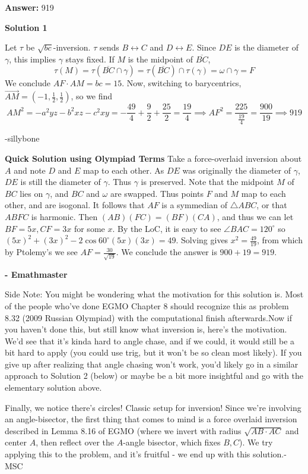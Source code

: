 \begin{enumerate}
 
 \textbf{Answer: }919



\textbf{Solution 1}

Let $\tau$ be $\sqrt{bc}$-inversion. $\tau$ sends $B \leftrightarrow C$ and $D\leftrightarrow E$. Since $DE$ is the diameter of $\gamma$, this implies $\gamma$ stays fixed. If $M$ is the midpoint of $\overline{BC}$, 
 \[\tau(M) = \tau(\overline{BC} \cap \gamma) = \tau(\overline{BC})\cap \tau(\gamma) = \omega \cap \gamma = F\] We conclude $AF\cdot AM = bc = 15$. Now, switching to barycentrics, $\overrightarrow{AM} = (-1, \frac{1}{2}, \frac{1}{2})$, so we find 
 \[AM^2 = -a^2yz-b^2xz-c^2xy = -\frac{49}{4} +\frac{9}{2}+\frac{25}{2} = \frac{19}{4} \implies AF^2 = \frac{225}{\frac{19}{4}}=\frac{900}{19} \implies \boxed{919}\]

 -sillybone

 \textbf{Quick Solution using Olympiad Terms} Take a force-overlaid inversion about $A$ and note $D$ and $E$ map to each other. As $DE$ was originally the diameter of $\gamma$, $DE$ is still the diameter of $\gamma$. Thus $\gamma$ is preserved. Note that the midpoint $M$ of $BC$ lies on $\gamma$, and $BC$ and $\omega$ are swapped. Thus points $F$ and $M$ map to each other, and are isogonal. It follows that $AF$ is a symmedian of $\triangle{ABC}$, or that $ABFC$ is harmonic. Then $(AB)(FC)=(BF)(CA)$, and thus we can let $BF=5x, CF=3x$ for some $x$. By the LoC, it is easy to see $\angle{BAC}=120^\circ$ so $(5x)^2+(3x)^2-2\cos{60^\circ}(5x)(3x)=49$. Solving gives $x^2=\frac{49}{19}$, from which by Ptolemy's we see $AF=\frac{30}{\sqrt{19}}$. We conclude the answer is $900+19=\boxed{919}$.

 \textbf{- Emathmaster}

 Side Note: You might be wondering what the motivation for this solution is. Most of the people who've done EGMO Chapter 8 should recognize this as problem 8.32 (2009 Russian Olympiad) with the computational finish afterwards.Now if you haven't done this, but still know what inversion is, here's the motivation. We'd see that it's kinda hard to angle chase, and if we could, it would still be a bit hard to apply (you could use trig, but it won't be so clean most likely). If you give up after realizing that angle chasing won't work, you'd likely go in a similar approach to Solution 2 (below) or maybe be a bit more insightful and go with the elementary solution above.

 Finally, we notice there's circles! Classic setup for inversion! Since we're involving an angle-bisector, the first thing that comes to mind is a force overlaid inversion described in Lemma 8.16 of EGMO (where we invert with radius $\sqrt{AB \cdot AC}$ and center $A$, then reflect over the $A$-angle bisector, which fixes $B, C$). We try applying this to the problem, and it's fruitful - we end up with this solution.-MSC


\end{enumerate}

